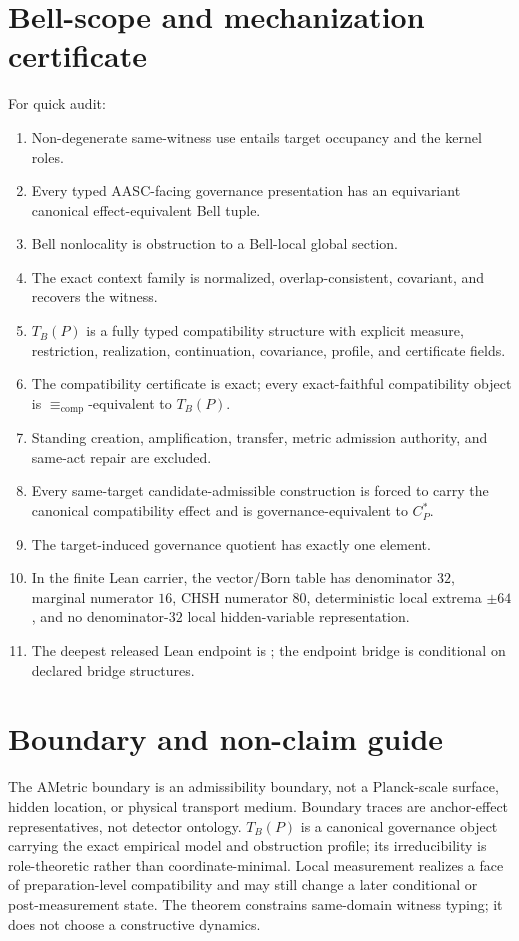 \documentclass[11pt]{article}
\theoremstyle{definition}
\newcommand{\CompEq}{\equiv_{\mathrm{comp}}}
\newcommand{\CanonC}{C^{*}_{P}}
\begin{document}
\section{Bell-scope and mechanization certificate}\label{app:certificate}
For quick audit:
\begin{enumerate}[leftmargin=2em]
\item Non-degenerate same-witness use entails target occupancy and the kernel roles.
\item Every typed AASC-facing governance presentation has an equivariant canonical effect-equivalent Bell tuple.
\item Bell nonlocality is obstruction to a Bell-local global section.
\item The exact context family is normalized, overlap-consistent, covariant, and recovers the witness.
\item $T_B(P)$ is a fully typed compatibility structure with explicit measure, restriction, realization, continuation, covariance, profile, and certificate fields.
\item The compatibility certificate is exact; every exact-faithful compatibility object is $\CompEq$-equivalent to $T_B(P)$.
\item Standing creation, amplification, transfer, metric admission authority, and same-act repair are excluded.
\item Every same-target candidate-admissible construction is forced to carry the canonical compatibility effect and is governance-equivalent to $\CanonC$.
\item The target-induced governance quotient has exactly one element.
\item In the finite Lean carrier, the vector/Born table has denominator $32$, marginal numerator $16$, CHSH numerator $80$, deterministic local extrema $\pm64$, and no denominator-$32$ local hidden-variable representation.
\item The deepest released Lean endpoint is ; the endpoint bridge is conditional on declared bridge structures.
\end{enumerate}

\section{Boundary and non-claim guide}\label{app:nonclaims}
The AMetric boundary is an admissibility boundary, not a Planck-scale surface, hidden location, or physical transport medium. Boundary traces are anchor-effect representatives, not detector ontology. $T_B(P)$ is a canonical governance object carrying the exact empirical model and obstruction profile; its irreducibility is role-theoretic rather than coordinate-minimal. Local measurement realizes a face of preparation-level compatibility and may still change a later conditional or post-measurement state. The theorem constrains same-domain witness typing; it does not choose a constructive dynamics.
\end{document}
